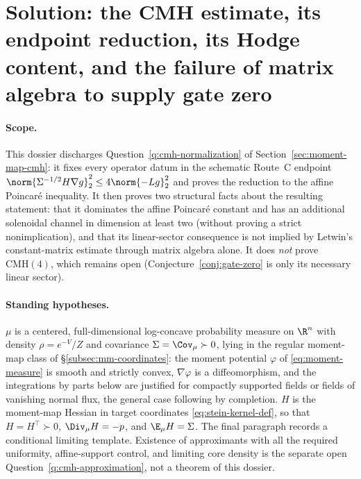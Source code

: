 \documentclass[../main.tex]{subfiles}
\begin{document}
%
\section*{Solution: the CMH estimate, its endpoint reduction, its Hodge content,
and the failure of matrix algebra to supply gate zero}
\label{sec:sol-cmh-normalization}

\paragraph{Scope.}
This dossier discharges Question~\ref{q:cmh-normalization} of
Section~\ref{sec:moment-map-cmh}: it fixes every operator datum in the schematic Route~C
endpoint $\norm{\Sigma^{-1/2}H\nabla g}_2^2\le4\norm{-Lg}_2^2$ and proves the reduction to the
affine Poincar\'e inequality. It then proves two structural facts about the resulting
statement: that it dominates the affine Poincar\'e constant and has an additional solenoidal
channel in dimension at least two (without proving a strict nonimplication), and that its
linear-sector consequence is not implied by Letwin's constant-matrix estimate through matrix
algebra alone. It does \emph{not} prove $\mathrm{CMH}(4)$, which remains open
(Conjecture~\ref{conj:gate-zero} is only its necessary linear sector).

\paragraph{Standing hypotheses.}
$\mu$ is a centered, full-dimensional log-concave probability measure on $\R^n$ with density
$\rho=e^{-V}/Z$ and covariance $\Sigma=\Cov_\mu\succ0$, lying in the regular moment-map class of
\S\ref{subsec:mm-coordinates}: the moment potential $\varphi$ of \eqref{eq:moment-measure} is
smooth and strictly convex, $\nabla\varphi$ is a diffeomorphism, and the integrations by parts
below are justified for compactly supported fields or fields of vanishing normal flux, the
general case following by completion. $H$ is the moment-map Hessian in target coordinates
\eqref{eq:stein-kernel-def}, so that $H=H^\top\succ0$, $\Div_\mu H=-p$, and $\E_\mu H=\Sigma$.
The final paragraph records a conditional limiting template. Existence of approximants with all
the required uniformity, affine-support control, and limiting core density is the separate open
Question~\ref{q:cmh-approximation}, not a theorem of this dossier.
\end{document}
